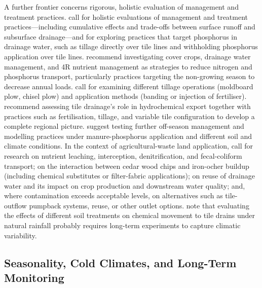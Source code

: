 \documentclass[11pt]{article}
\begin{document}
A further frontier concerns rigorous, holistic evaluation of management and treatment practices. \textcite{King2015} call for holistic evaluations of management and treatment practices---including cumulative effects and trade-offs between surface runoff and subsurface drainage---and for exploring practices that target phosphorus in drainage water, such as tillage directly over tile lines and withholding phosphorus application over tile lines. \textcite{King2016} recommend investigating cover crops, drainage water management, and 4R nutrient management as strategies to reduce nitrogen and phosphorus transport, particularly practices targeting the non-growing season to decrease annual loads. \textcite{Williams2016} call for examining different tillage operations (moldboard plow, chisel plow) and application methods (banding or injection of fertiliser). \textcite{Kokulan2021} recommend assessing tile drainage's role in hydrochemical export together with practices such as fertilisation, tillage, and variable tile configuration to develop a complete regional picture. \textcite{Qi2018} suggest testing further off-season management and modelling practices under manure-phosphorus application and different soil and climate conditions. In the context of agricultural-waste land application, \textcite{BACKLUND1995} call for research on nutrient leaching, interception, denitrification, and fecal-coliform transport; on the interaction between cedar wood chips and iron-ocher buildup (including chemical substitutes or filter-fabric applications); on reuse of drainage water and its impact on crop production and downstream water quality; and, where contamination exceeds acceptable levels, on alternatives such as tile-outflow pumpback systems, reuse, or other outlet options. \textcite{Fortin2002} note that evaluating the effects of different soil treatments on chemical movement to tile drains under natural rainfall probably requires long-term experiments to capture climatic variability.

\subsection{Seasonality, Cold Climates, and Long-Term Monitoring}
\end{document}
